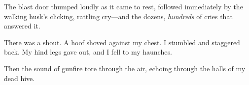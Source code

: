 The blast door thumped loudly as it came to rest, followed immediately by the walking husk’s clicking, rattling cry—and the dozens, \textit{hundreds} of cries that answered it.

There was a shout. A hoof shoved against my chest. I stumbled and staggered back. My hind legs gave out, and I fell to my haunches.

Then the sound of gunfire tore through the air, echoing through the halls of my dead hive.